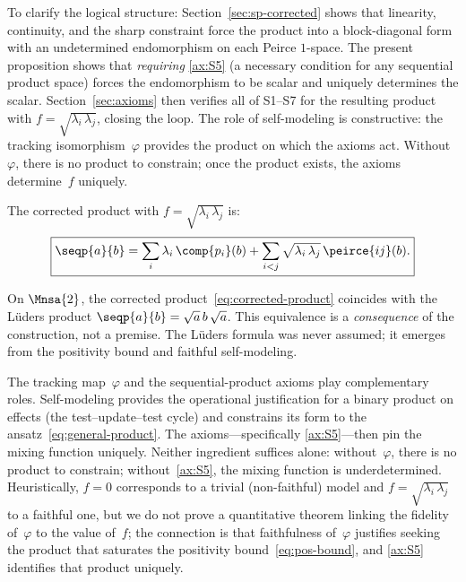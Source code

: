\documentclass[11pt]{article}
\begin{document}
\noindent
To clarify the logical structure: Section~\ref{sec:sp-corrected}
shows that linearity, continuity, and the sharp constraint force
the product into a block-diagonal form with an undetermined
endomorphism on each Peirce $1$-space.  The present proposition
shows that \emph{requiring} \ref{ax:S5} (a necessary condition for
any sequential product space) forces the endomorphism to be scalar
and uniquely determines the scalar.
Section~\ref{sec:axioms} then verifies all of S1--S7 for the
resulting product with
$f = \sqrt{\lambda_{i}\, \lambda_{j}}$, closing the loop.
The role of self-modeling is constructive: the tracking
isomorphism~$\varphi$ provides the product on which the axioms
act.  Without~$\varphi$, there is no product to constrain; once
the product exists, the axioms determine~$f$ uniquely.

The corrected product with
$f = \sqrt{\lambda_{i}\, \lambda_{j}}$ is:
\begin{equation}\label{eq:corrected-product}
  \boxed{
  \seqp{a}{b}
  = \sum_{i} \lambda_{i}\, \comp{p_{i}}(b)
  + \sum_{i < j} \sqrt{\lambda_{i}\, \lambda_{j}}\,
    \peirce{ij}(b).
  }
\end{equation}

\begin{remark}
  On $\Mnsa{2}$, the corrected
  product~\eqref{eq:corrected-product} coincides with the L\"uders
  product $\seqp{a}{b} = \sqrt{a}\, b\, \sqrt{a}$.  This equivalence
  is a \emph{consequence} of the construction, not a premise.  The
  L\"uders formula was never assumed; it emerges from the positivity
  bound and faithful self-modeling.
\end{remark}

\begin{remark}\label{rem:division}
  The tracking map~$\varphi$ and the sequential-product axioms play
  complementary roles.  Self-modeling provides the operational
  justification for a binary product on effects (the
  test--update--test cycle) and constrains its form to the
  ansatz~\eqref{eq:general-product}.  The axioms---specifically
  \ref{ax:S5}---then pin the mixing function uniquely.  Neither
  ingredient suffices alone: without~$\varphi$, there is no product
  to constrain; without~\ref{ax:S5}, the mixing function is
  underdetermined.  Heuristically, $f = 0$ corresponds to a trivial
  (non-faithful) model and $f = \sqrt{\lambda_{i}\, \lambda_{j}}$
  to a faithful one, but we do not prove a quantitative theorem
  linking the fidelity of~$\varphi$ to the value of~$f$; the
  connection is that faithfulness of~$\varphi$ justifies seeking the
  product that saturates the positivity
  bound~\eqref{eq:pos-bound}, and \ref{ax:S5} identifies that
  product uniquely.
\end{remark}
\end{document}
